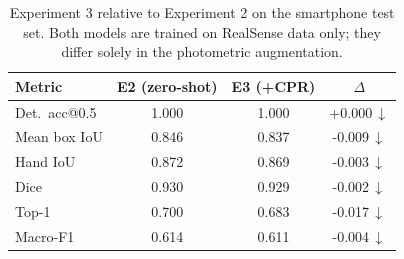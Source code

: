 \begin{table}[t]
\centering
\caption{Experiment 3 relative to Experiment 2 on the smartphone test set. Both models are trained on RealSense data only; they differ solely in the photometric augmentation.}
\label{tab:gain}
\begin{tabular}{lccc}
\toprule
Metric & E2 (zero-shot) & E3 (+CPR) & $\Delta$ \\
\midrule
Det.\ acc@0.5 & 1.000 & 1.000 & +0.000\,$\downarrow$ \\
Mean box IoU & 0.846 & 0.837 & -0.009\,$\downarrow$ \\
Hand IoU & 0.872 & 0.869 & -0.003\,$\downarrow$ \\
Dice & 0.930 & 0.929 & -0.002\,$\downarrow$ \\
Top-1 & 0.700 & 0.683 & -0.017\,$\downarrow$ \\
Macro-F1 & 0.614 & 0.611 & -0.004\,$\downarrow$ \\
\bottomrule
\end{tabular}
\end{table}
